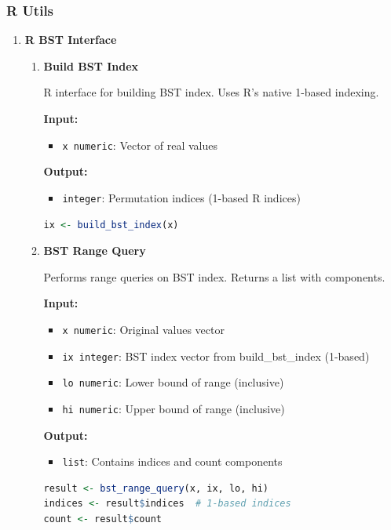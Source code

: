 \subsubsection{R Utils}
\begin{enumerate}
    \item \textbf{R BST Interface}
          
          \begin{enumerate}
            \item \textbf{Build BST Index}
                  
                  R interface for building BST index. Uses R's native 1-based indexing.
                  
                  \textbf{Input:}
                  \begin{itemize}
                    \item \texttt{x numeric}: Vector of real values
                  \end{itemize}
                  \textbf{Output:}
                  \begin{itemize}
                    \item \texttt{integer}: Permutation indices (1-based R indices)
                  \end{itemize}
                  \begin{lstlisting}[language=R]
ix <- build_bst_index(x)
                  \end{lstlisting}
                  
            \item \textbf{BST Range Query}
                  
                  Performs range queries on BST index. Returns a list with components.
                  
                  \textbf{Input:}
                  \begin{itemize}
                    \item \texttt{x numeric}: Original values vector
                          
                    \item \texttt{ix integer}: BST index vector from build\_bst\_index (1-based)
                          
                    \item \texttt{lo numeric}: Lower bound of range (inclusive)
                          
                    \item \texttt{hi numeric}: Upper bound of range (inclusive)
                  \end{itemize}
                  \textbf{Output:}
                  \begin{itemize}
                    \item \texttt{list}: Contains indices and count components
                  \end{itemize}
                  \begin{lstlisting}[language=R]
result <- bst_range_query(x, ix, lo, hi)
indices <- result$indices  # 1-based indices
count <- result$count
                  \end{lstlisting}
                  

\end{enumerate}
\end{enumerate}
